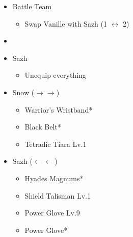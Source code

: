 \begin{menu}
	\begin{itemize}
		\paradigm
		\begin{itemize}
			\item Battle Team
				\begin{itemize}
					\item Swap Vanille with Sazh (1 $\leftrightarrow$ 2)
				\end{itemize}
			\item {}%
				{\paradigmline{\com}{\com}{\com}}%
				{\paradigmline{\com}{\com}{\com}}%
				{\paradigmline{\com}{(\sab)}{(\sen)}}%
				{\paradigmline[4]{(\syn)}{(\sab)}{(\sen)}}%
				{\paradigmline{(\com)}{(\med)}{(\sen)}}%
				{\paradigmline{\rav}{\rav}{\rav}}%
		\end{itemize}
		\equip
		\begin{itemize}
			\item Sazh
				\begin{itemize}
					\item Unequip everything
				\end{itemize}
			\item Snow ($\rightarrow\rightarrow$)
				\begin{itemize}
					\item Warrior's Wristband*
					\item Black Belt*
					\item Tetradic Tiara Lv.1
				\end{itemize}
			\item Sazh ($\leftarrow\leftarrow$)
				\begin{itemize}
					\item Hyades Magnums*
					\item Shield Talisman Lv.1
					\item Power Glove Lv.9
					\item Power Glove*
				\end{itemize}								
		\end{itemize}
	\end{itemize}
\end{menu}

\renewcommand{\first}{[1] Cerberus (\com/\com/\com)}
\renewcommand{\second}{[2] Cerberus (\com/\com/\com)}
\renewcommand{\third}{[3] Dirty Fighting (\com/\sab/\sen)}
\renewcommand{\fourth}{[4] Premeditation (\syn/\sab/\sen)}
\renewcommand{\fifth}{[5] Solidarity (\com/\med/\sen)}
\renewcommand{\sixth}{[6] Tri-Disaster (\rav/\rav/\rav)}

